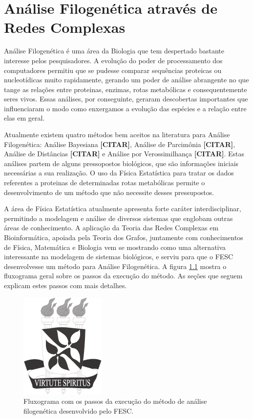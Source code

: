 \chapter{Análise Filogenética através de Redes Complexas} \label{cap:analisefilo}

Análise Filogenética é uma área da Biologia que tem despertado bastante interesse pelos pesquisadores. A evolução do poder de processamento dos computadores
permitiu que se pudesse comparar sequências proteicas ou nucleotídicas muito rapidamente, gerando um poder de análise abrangente no que tange as relações entre
proteinas, enzimas, rotas metabólicas e consequentemente seres vivos. Essas análises, por conseguinte, geraram descobertas importantes que influenciaram o
modo como enxergamos a evolução das espécies e a relação entre elas em geral.

Atualmente existem quatro métodos bem aceitos na literatura para Análise Filogenética: Análise Bayesiana \textbf{[CITAR]}, Análise de Parcimônia
\textbf{[CITAR]}, Análise de Distâncias \textbf{[CITAR]} e Análise por Verossimilhança \textbf{[CITAR]}. Estas análises partem de alguns pressopostos
biológicos, que são informações iniciais necessárias a sua realização. O uso da Física Estatística para tratar os dados referentes a proteinas de
determinadas rotas metabólicas permite o desenvolvimento de um método que não necessite desses pressupostos.

A área de Física Estatística atualmente apresenta forte caráter interdisciplinar, permitindo a modelagem e análise de diversos sistemas
que englobam outras áreas de conhecimento. A aplicação da Teoria das Redes Complexas em Bioinformática, apoiada pela Teoria dos Grafos,
juntamente com conhecimentos de Física, Matemática e Biologia vem se mostrando como uma alternativa interessante na modelagem de sistemas biológicos,
e serviu para que o FESC desenvolvesse um método para Análise Filogenética. A figura \ref{fig:fluxograma} mostra o fluxograma geral sobre os passos da
execução do método. As seções que seguem explicam estes passos com mais detalhes.

\begin{figure}
\centering
\includegraphics{brasaoUFBA2}
\caption{Fluxograma com os passos da execução do método de análise filogenética desenvolvido pelo FESC.}
\label{fig:fluxograma}
\end{figure}


